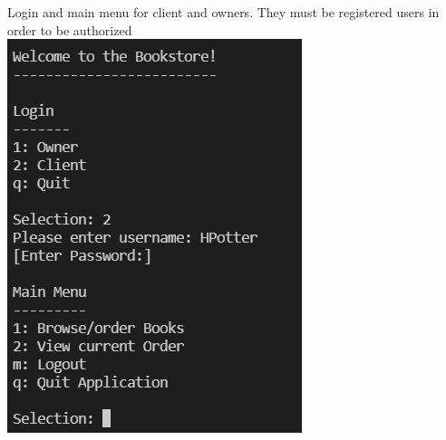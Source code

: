 \documentclass[Project Report]{article}
\begin{document}
Login and main menu for client and owners. They must be registered users in order to be authorized\\
{\centering \includegraphics[width=\textwidth]{../Screenshots/Client_login_main_menu.png}}
\end{document}
